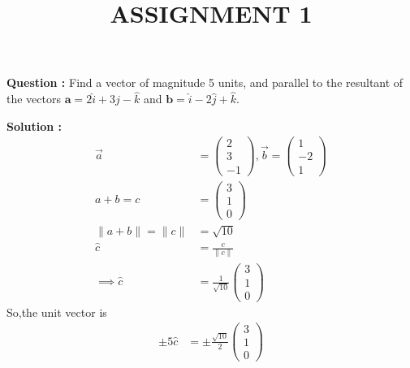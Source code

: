 \documentclass[12pt]{article}
\let\vec\mathbf
\providecommand{\norm}[1]{\lVert#1\rVert}
\begin{document}
\title{\textbf{ASSIGNMENT 1}}
\date{}
\maketitle
\textbf{Question :} Find a vector of magnitude 5 units, and parallel to the resultant of the vectors $\vec{a} = 2\hat{i}+3\hat{j}-\hat{k}$ and $\vec{b} = \hat{i}-2\hat{j}+\hat{k}$.

\textbf{Solution :}
\begin{align}
    \Vec{a}&=\begin{pmatrix}
        2\\3\\-1
    \end{pmatrix},\Vec{b}=\begin{pmatrix}
        1\\-2\\1
    \end{pmatrix}\\
    a+b=c&=\begin{pmatrix}
        3\\1\\0
    \end{pmatrix}\\
    \norm{a+b}=\norm{c}&=\sqrt{10}\\
    \hat{c}&=\frac{c}{\norm{c}} \\
    \implies\hat{c}&=\frac{1}{\sqrt{10}}\begin{pmatrix}
        3\\1\\0
    \end{pmatrix}
\end{align}
So,the unit vector is
\begin{align}
    \pm5\hat{c}&=\pm\frac{\sqrt{10}}{2}\begin{pmatrix}
        3\\1\\0
    \end{pmatrix}
\end{align}
   
\end{document}
